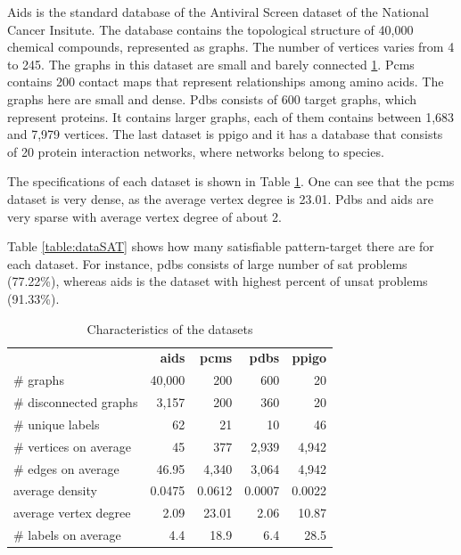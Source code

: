 \documentclass{l4proj}
\begin{document}
Aids is the standard database of the Antiviral Screen dataset of the National Cancer Insitute. The database contains the topological structure of 40,000 chemical compounds, represented as graphs. The number of vertices varies from 4 to 245. The graphs in this dataset are small and barely connected \ref{table:datasets}. Pcms contains 200 contact maps that represent relationships among amino acids. The graphs here are small and dense. Pdbs consists of 600 target graphs, which represent proteins. It contains larger graphs, each of them contains between 1,683 and 7,979 vertices. The last dataset is ppigo and it has a database that consists of 20 protein interaction networks, where networks belong to species.

The specifications of each dataset is shown in Table \ref{table:datasets}. One can see that the pcms dataset is very dense, as the average vertex degree is 23.01. Pdbs and aids are very sparse with average vertex degree of about 2.

Table \ref{table:dataSAT} shows how many satisfiable pattern-target there are for each dataset. For instance, pdbs consists of large number of \gls{sat} problems (77.22\%), whereas aids is the dataset with highest percent of \gls{unsat} problems (91.33\%).

\begin{table}
\centering
        \renewcommand{\arraystretch}{1.4}%
        \begin{tabular}{l|r|r|r|r|}
\cline{2-5}
& \textbf{aids} & \textbf{pcms} & \textbf{pdbs} & \textbf{ppigo} \\
\cline{1-5}
\multicolumn{1}{|l|}{\# graphs}  & 40,000 & 200	& 600   & 20 \\
\hline
\multicolumn{1}{|l|}{\# disconnected graphs} & 3,157 & 200 & 360 & 20 \\
\hline
\multicolumn{1}{|l|}{\# unique labels} & 62 & 21 & 10 & 46 \\
\hline
\multicolumn{1}{|l|}{\# vertices on average} & 45 & 377 & 2,939 & 4,942 \\
\hline
\multicolumn{1}{|l|}{\# edges on average} & 46.95 & 4,340 & 3,064 & 4,942 \\
\hline
\multicolumn{1}{|l|}{average density} & 0.0475 & 0.0612 & 0.0007 & 0.0022 \\
\hline
\multicolumn{1}{|l|}{average vertex degree} & 2.09 & 23.01 & 2.06 & 10.87 \\
\hline
\multicolumn{1}{|l|}{\# labels on average} & 4.4 & 18.9 & 6.4 & 28.5 \\
\hline
\end{tabular}
\caption{Characteristics of the datasets}
\label{table:datasets}
\end{table}
\end{document}
